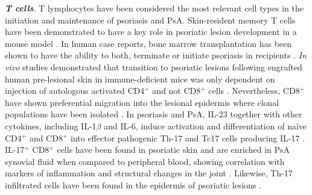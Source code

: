 \textbf{\textit{T cells}}. T lymphocytes have been considered the most relevant cell types in the initiation and maintenance of psoriasis and PsA.  Skin-resident memory T cells have been demonstrated to have a key role in psoriatic lesion development in a mouse model \parencite{Boyman2004}. In human case reports, bone marrow transplantation has been shown to have the ability to both, terminate or initiate psoriasis in recipients \parencite{Gardembas-Pain1990, Eedy1990}. \textit{In vivo} studies demonstrated that transition to psoriatic lesions following engrafted human pre-lesional skin in immune-deficient mice was only dependent on injection of autologous activated CD4$^+$ and not CD8$^+$ cells \parencite{Wrone-Smith1996}. Nevertheless, CD8$^+$ have shown preferential migration into the lesional epidermis where clonal populations have been isolated \parencite{Wrone-Smith1996, Chang1994}. %
In psoriasis and PsA, IL-23 together with other cytokines, including IL-1$\beta$ and IL-6, induce activation and differentiation of na\"{i}ve CD4$^+$ and CD8$^+$ into effector pathogenic Th-17 and Tc17 cells producing IL-17 \parencite{Weaver2007}. IL-17$^+$ CD8$^+$ cells have been found in psoriatic skin and are enriched in PsA synovial fluid when compared to peripheral blood, showing correlation with markers of inflammation and structural changes in the joint \parencite{Menon2014,Ortega2009}. Likewise, Th-17 infiltrated cells have been found in the epidermis of psoriatic lesions \parencite{Lowes2008, Pene2008}. %




